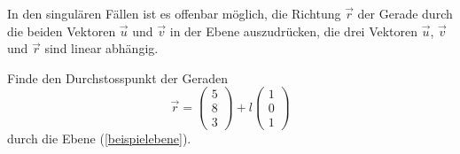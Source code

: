 In den singulären Fällen ist es offenbar möglich, die Richtung $\vec r$
der Gerade durch die beiden Vektoren $\vec u$ und $\vec v$ in der Ebene
auszudrücken, die drei Vektoren $\vec u$, $\vec v$ und $\vec r$ sind
linear abhängig.

\begin{beispiel}
Finde den Durchstosspunkt der Geraden
\[
\vec r=
\begin{pmatrix} 5\\8\\3 \end{pmatrix}
+
l\begin{pmatrix} 1\\0\\1 \end{pmatrix}
\]
durch die Ebene (\ref{beispielebene}).

\smallskip


\end{beispiel}
